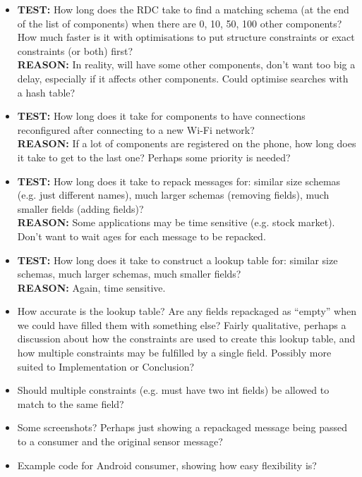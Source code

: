 \documentclass[12pt,twoside,notitlepage]{report}
\begin{document}
\begin{itemize}
\item
{\bf TEST: } How long does the RDC take to find a matching schema (at the end of the list of components) when there are 0, 10, 50, 100 other components? How much faster is it with optimisations to put structure constraints or exact constraints (or both) first?\\
{\bf REASON: } In reality, will have some other components, don't want too big a delay, especially if it affects other components. Could optimise searches with a hash table?

\item
{\bf TEST: } How long does it take for components to have connections reconfigured after connecting to a new Wi-Fi network?\\
{\bf REASON: } If a lot of components are registered on the phone, how long does it take to get to the last one? Perhaps some priority is needed?

\item
{\bf TEST: } How long does it take to repack messages for: similar size schemas (e.g. just different names), much larger schemas (removing fields), much smaller fields (adding fields)?\\
{\bf REASON: } Some applications may be time sensitive (e.g. stock market). Don't want to wait ages for each message to be repacked.

\item
{\bf TEST: } How long does it take to construct a lookup table for: similar size schemas, much larger schemas, much smaller fields?\\
{\bf REASON: } Again, time sensitive.

\item How accurate is the lookup table? Are any fields repackaged as ``empty'' when we could have filled them with something else? Fairly qualitative, perhaps a discussion about how the constraints are used to create this lookup table, and how multiple constraints may be fulfilled by a single field. Possibly more suited to Implementation or Conclusion?

\item Should multiple constraints (e.g. must have two int fields) be allowed to match to the same field?

\item Some screenshots? Perhaps just showing a repackaged message being passed to a consumer and the original sensor message?

\item Example code for Android consumer, showing how easy flexibility is?


\end{itemize}
\end{document}
